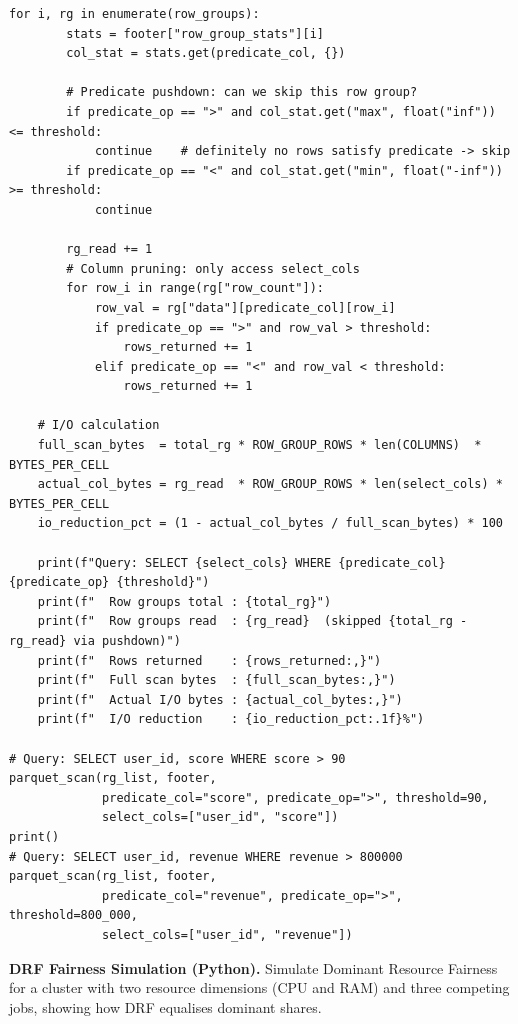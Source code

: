 \begin{lstlisting}[style=pyspark, caption={PE5.2: Parquet predicate pushdown simulator}]
    for i, rg in enumerate(row_groups):
        stats = footer["row_group_stats"][i]
        col_stat = stats.get(predicate_col, {})

        # Predicate pushdown: can we skip this row group?
        if predicate_op == ">" and col_stat.get("max", float("inf")) <= threshold:
            continue    # definitely no rows satisfy predicate -> skip
        if predicate_op == "<" and col_stat.get("min", float("-inf")) >= threshold:
            continue

        rg_read += 1
        # Column pruning: only access select_cols
        for row_i in range(rg["row_count"]):
            row_val = rg["data"][predicate_col][row_i]
            if predicate_op == ">" and row_val > threshold:
                rows_returned += 1
            elif predicate_op == "<" and row_val < threshold:
                rows_returned += 1

    # I/O calculation
    full_scan_bytes  = total_rg * ROW_GROUP_ROWS * len(COLUMNS)  * BYTES_PER_CELL
    actual_col_bytes = rg_read  * ROW_GROUP_ROWS * len(select_cols) * BYTES_PER_CELL
    io_reduction_pct = (1 - actual_col_bytes / full_scan_bytes) * 100

    print(f"Query: SELECT {select_cols} WHERE {predicate_col} {predicate_op} {threshold}")
    print(f"  Row groups total : {total_rg}")
    print(f"  Row groups read  : {rg_read}  (skipped {total_rg - rg_read} via pushdown)")
    print(f"  Rows returned    : {rows_returned:,}")
    print(f"  Full scan bytes  : {full_scan_bytes:,}")
    print(f"  Actual I/O bytes : {actual_col_bytes:,}")
    print(f"  I/O reduction    : {io_reduction_pct:.1f}%")

# Query: SELECT user_id, score WHERE score > 90
parquet_scan(rg_list, footer,
             predicate_col="score", predicate_op=">", threshold=90,
             select_cols=["user_id", "score"])
print()
# Query: SELECT user_id, revenue WHERE revenue > 800000
parquet_scan(rg_list, footer,
             predicate_col="revenue", predicate_op=">", threshold=800_000,
             select_cols=["user_id", "revenue"])
\end{lstlisting}

\pe \textbf{DRF Fairness Simulation (Python).}
Simulate Dominant Resource Fairness for a cluster with two resource
dimensions (CPU and RAM) and three competing jobs, showing how DRF
equalises dominant shares.

